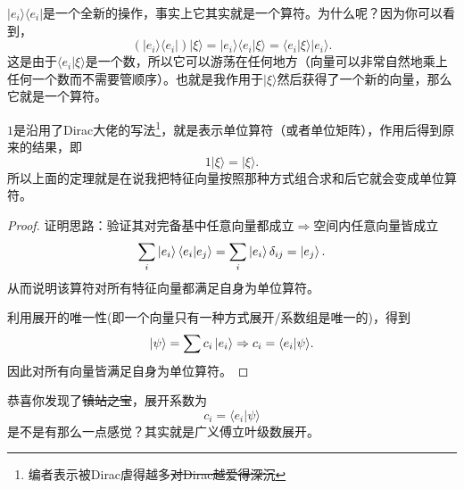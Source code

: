 \documentclass[12pt,a4paper,openany,twoside]{book}
\numberwithin{equation}{section}
\newcommand{\bracket}[2]{\langle #1 | #2 \rangle}
\begin{document}
          $| e_i \rangle \langle e_i | $是一个全新的操作，事实上它其实就是一个算符。为什么呢？因为你可以看到，
          \begin{equation}
            (| e_i \rangle \langle e_i | ) | \xi \rangle = | e_i \rangle \langle e_i | \xi \rangle = \langle e_i | \xi \rangle | e_i \rangle  .
            \label{ ket bra }
          \end{equation}
          这是由于$ \langle e_i | \xi \rangle $是一个数，所以它可以游荡在任何地方（向量可以非常自然地乘上任何一个数而不需要管顺序）。也就是我作用于$| \xi \rangle $然后获得了一个新的向量，那么它就是一个算符。

          $1$是沿用了Dirac大佬的写法\footnote{编者表示被Dirac虐得越多\sout{对Dirac越爱得深沉}}，就是表示单位算符（或者单位矩阵），作用后得到原来的结果，即
          \begin{equation}
            1 | \xi \rangle = | \xi \rangle .
          \end{equation}
          所以上面的定理就是在说我把特征向量按照那种方式组合求和后它就会变成单位算符。

          \begin{proof}
            证明思路：验证其对完备基中任意向量都成立$\Rightarrow$空间内任意向量皆成立
            \begin{equation}
              \sum_i \ket{e_i}\bracket{e_i}{e_j} = \sum_i\ket{e_i} \delta_{ij} = \ket{e_j}.
            \end{equation}
            从而说明该算符对所有特征向量都满足自身为单位算符。

            利用展开的唯一性(即一个向量只有一种方式展开/系数组是唯一的)，得到
            \begin{equation}
              \ket{\psi} = \sum c_i \ket{e_i} \Rightarrow c_i = \bracket{e_i}{\psi}.
            \end{equation}
            因此对所有向量皆满足自身为单位算符。
          \end{proof}
          恭喜你发现了\sout{镇站之宝}，展开系数为
          \begin{equation}
            c_i = \langle e_i | \psi \rangle 
            \label{expansion coeff}
          \end{equation}
          是不是有那么一点感觉？其实就是广义傅立叶级数展开。
\end{document}
